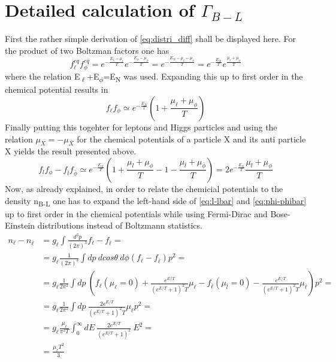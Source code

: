 \section{Detailed calculation of $\Gamma_{B-L}$}
\label{ap:Gamma_B-L}
First the rather simple derivation of \ref{eq:distri_diff} shall be displayed here. For the product of two Boltzman factors one has
\begin{equation*}
f_\ell^{eq}f_\phi^{eq}=e^{-\frac{E_\ell-\mu_\ell}{T}}e^{-\frac{E_\phi-\mu_\phi}{T}}=e^{-\frac{E_N-\mu_\ell-\mu_\phi}{T}}=e^{-\frac{E_N}{T}}e^{\frac{\mu_\ell+\mu_\phi}{T}}
\end{equation*}
where the relation E\textsubscript{$\ell$}+E\textsubscript{$\phi$}=E\textsubscript{N} was used. \newline
Expanding this up to first order in the chemical potential results in
\begin{equation*}
f_\ell f_\phi\simeq e^{-\frac{E_N}{T}}\left(1+\frac{\mu_\ell+\mu_\phi}{T}\right)
\end{equation*}
Finally putting this togehter for leptons and Higgs particles and using the relation $\mu_X=-\mu_{\bar{X}}$ for the chemical potentials of a particle X and its anti particle X yields the result presented above. 
\begin{equation*}
f_lf_\phi-f_{\bar{l}}f_{\bar{\phi}}\simeq e^{-\frac{E_N}{T}}\left(1+\frac{\mu_l+\mu_\phi}{T}-1-\frac{\mu_{\bar{l}}+\mu_{\bar{\phi}}}{T}\right)=2e^{-\frac{E_N}{T}}\frac{\mu_l+\mu_\phi}{T}
\end{equation*}
\newline
Now, as already explained, in order to relate the chemicial potentials to the density n\textsubscript{B-L} one has to expand the left-hand side of \ref{eq:l-lbar} and \ref{eq:phi-phibar} up to first order in the chemical potentials while using Fermi-Dirac and Bose-Einstein distributions instead of Boltzmann statistics.
\begin{align*}
	n_\ell-n_{\bar{\ell}}&=g_\ell\int\frac{d^3p}{\left(2\pi\right)^3}f_\ell-f_{\bar{\ell}}=\\
	&=g_\ell\frac{1}{\left(2\pi\right)^3}\int dp\:dcos\theta \:d\phi\left(f_\ell-f_{\bar{\ell}}\right)p^2=\\
	&=g_\ell\frac{1}{2\pi^2}\int dp \: \left(f_\ell\left(\mu_\ell=0\right)+\frac{e^{E/T}}{\left(e^{E/T}+1\right)^2T}\mu_\ell-f_{\bar{\ell}}\left(\mu_{\bar{l}}=0\right)-\frac{e^{E/T}}{\left(e^{E/T}+1\right)^2T}\mu_{\bar{\ell}}\right)p^2=\\
	&=g_\ell\frac{1}{2\pi^2}\int dp\: \frac{2e^{E/T}}{\left(e^{E/T}+1\right)^2T}\mu_\ell p^2=\\
	&=g_\ell\frac{\mu_\ell}{\pi^2T}\int_{0}^{\infty}dE\:\frac{2e^{E/T}}{\left(e^{E/T}+1\right)^2}\:E^2=\\
	&=\frac{\mu_\ell T^2}{3}
\end{align*}
